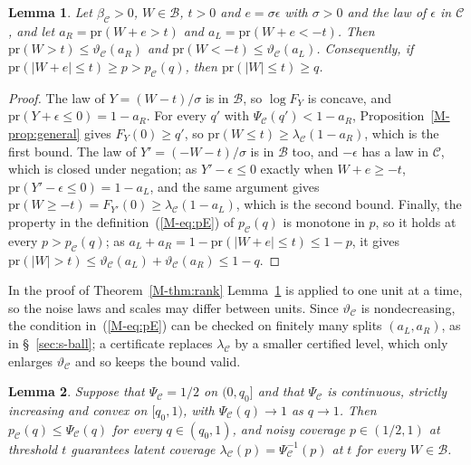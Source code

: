 \documentclass[12pt]{article}
\renewcommand{\_}{\usc\allowbreak}
\newtheorem{lemma}{Lemma}
\theoremstyle{definition}
\numberwithin{equation}{section}
\newcommand{\pr}{\mathrm{pr}}
\newcommand{\B}{\mathcal{B}}
\newcommand{\E}{\mathcal{C}}
\begin{document}
\begin{lemma}\label{lem:twoend}
Let $\beta_{\E} > 0$, $W \in \B$, $t > 0$ and $e = \sigma\epsilon$ with $\sigma > 0$ and the law of $\epsilon$ in $\E$, and let $a_R = \pr(W + e > t)$ and $a_L = \pr(W + e < -t)$. Then $\pr(W > t) \le \vartheta_{\E}(a_R)$ and $\pr(W < -t) \le \vartheta_{\E}(a_L)$. Consequently, if $\pr(|W + e| \le t) \ge p > p_{\E}(q)$, then $\pr(|W| \le t) \ge q$.
\end{lemma}

\begin{proof}
The law of $Y = (W - t)/\sigma$ is in $\B$, so $\log F_Y$ is concave, and $\pr(Y + \epsilon \le 0) = 1 - a_R$. For every $q'$ with $\Psi_{\E}(q') < 1 - a_R$, Proposition~\ref{M-prop:general} gives $F_Y(0) \ge q'$, so $\pr(W \le t) \ge \lambda_{\E}(1 - a_R)$, which is the first bound. The law of $Y' = (-W - t)/\sigma$ is in $\B$ too, and $-\epsilon$ has a law in $\E$, which is closed under negation; as $Y' - \epsilon \le 0$ exactly when $W + e \ge -t$, $\pr(Y' - \epsilon \le 0) = 1 - a_L$, and the same argument gives $\pr(W \ge -t) = F_{Y'}(0) \ge \lambda_{\E}(1 - a_L)$, which is the second bound. Finally, the property in the definition~(\ref{M-eq:pE}) of $p_{\E}(q)$ is monotone in $p$, so it holds at every $p > p_{\E}(q)$; as $a_L + a_R = 1 - \pr(|W + e| \le t) \le 1 - p$, it gives $\pr(|W| > t) \le \vartheta_{\E}(a_L) + \vartheta_{\E}(a_R) \le 1 - q$.
\end{proof}

In the proof of Theorem~\ref{M-thm:rank} Lemma~\ref{lem:twoend} is applied to one unit at a time, so the noise laws and scales may differ between units. Since $\vartheta_{\E}$ is nondecreasing, the condition in~(\ref{M-eq:pE}) can be checked on finitely many splits $(a_L, a_R)$, as in \S~\ref{sec:s-ball}; a certificate replaces $\lambda_{\E}$ by a smaller certified level, which only enlarges $\vartheta_{\E}$ and so keeps the bound valid.

\begin{lemma}\label{lem:convex}
Suppose that $\Psi_{\E} = 1/2$ on $(0, q_0]$ and that $\Psi_{\E}$ is continuous, strictly increasing and convex on $[q_0, 1)$, with $\Psi_{\E}(q) \to 1$ as $q \to 1$. Then $p_{\E}(q) \le \Psi_{\E}(q)$ for every $q \in (q_0, 1)$, and noisy coverage $p \in (1/2, 1)$ at threshold $t$ guarantees latent coverage $\lambda_{\E}(p) = \Psi_{\E}^{-1}(p)$ at $t$ for every $W \in \B$.
\end{lemma}
\end{document}
